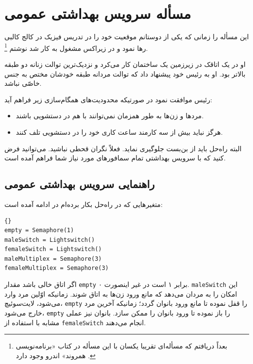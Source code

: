 \documentclass{book}
\newcommand{\clearemptydoublepage}{}%
\begin{document}

\section{مسأله سرویس بهداشتی عمومی}

    این مسأله را زمانی که یکی از دوستانم موقعیت خود را در تدریس فیزیک در کالج کالبی رها نمود 
    و در زیراکس مشغول به کار شد نوشتم%
    \footnote{بعداً دریافتم که مسأله‌ای تقریبا یکسان با این مسأله در کتاب «برنامه‌نویسی همروند» اندرو وجود دارد \cite{andrews}.}. 

    او  در یک اتاقک در زیرزمین یک ساختمان کار می‌کرد و نزدیک‌ترین توالت زنانه دو طبقه بالاتر بود.
    او به رئیس خود پیشنهاد داد که توالت مردانه طبقه خودشان مختص به جنس خاصّی نباشد. 

    رئیس موافقت نمود در صورتیکه محدودیت‌های همگام‌سازی زیر فراهم آید: 

\begin {itemize}

\item
    مردها و زن‌ها به طور همزمان نمی‌توانند با هم در دستشویی باشند. 

\item
    هرگز نباید بیش از سه کارمند ساعت کاری خود را در دستشویی تلف کنند. 
\end{itemize}

    البته راه‌حل باید از بن‌بست جلوگیری نماید. فعلاً نگران قحطی نباشید. می‌توانید فرض کنید که با سرویس بهداشتی تمام سمافورهای 
    مورد نیاز شما فراهم آمده است. 


\clearemptydoublepage
\subsection{راهنمایی سرویس بهداشتی عمومی}

    متغیرهایی که در راه‌حل بکار برده‌ام در ادامه آمده است:

\begin{latin}
\begin{lstlisting}[title=\rl{راهنمایی سرویس بهداشتی عمومی}]{}
empty = Semaphore(1)
maleSwitch = Lightswitch()
femaleSwitch = Lightswitch()
maleMultiplex = Semaphore(3)
femaleMultiplex = Semaphore(3)
\end{lstlisting}
\end{latin}

     اگر اتاق خالی باشد مقدار {\tt empty} برابر ۱ است در غیر اینصورت ۰. 
    {\tt maleSwitch} 
    این امکان را به مردان می‌دهد که مانع ورود زن‌ها به اتاق شوند. زمانیکه اوّلین مرد وارد می‌شود، لایت‌سوئیچ، {\tt empty} را قفل نموده تا 
    مانع ورود بانوان گردد؛ زمانیکه آخرین مرد خارج می‌شود، {\tt empty} را باز نموده تا ورود بانوان را ممکن سازد. بانوان نیز 
    عملی مشابه با استفاده از {\tt femaleSwitch} انجام می‌دهند.
\end{document}

